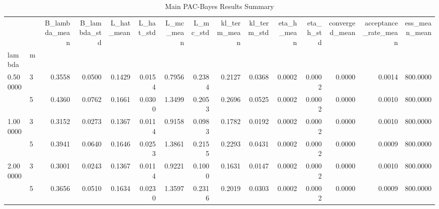 \begin{table}
\caption{Main PAC-Bayes Results Summary}
\label{tab:main_results}
\begin{tabular}{llrrrrrrrrrrrrr}
\toprule
 &  & B_lambda_mean & B_lambda_std & L_hat_mean & L_hat_std & L_mc_mean & L_mc_std & kl_term_mean & kl_term_std & eta_h_mean & eta_h_std & converged_mean & acceptance_rate_mean & ess_mean_mean \\
lambda & m &  &  &  &  &  &  &  &  &  &  &  &  &  \\
\midrule
\multirow[t]{2}{*}{0.500000} & 3 & 0.3558 & 0.0500 & 0.1429 & 0.0154 & 0.7956 & 0.2384 & 0.2127 & 0.0368 & 0.0002 & 0.0002 & 0.0000 & 0.0014 & 800.0000 \\
 & 5 & 0.4360 & 0.0762 & 0.1661 & 0.0300 & 1.3499 & 0.2053 & 0.2696 & 0.0525 & 0.0002 & 0.0002 & 0.0000 & 0.0010 & 800.0000 \\
\cline{1-15}
\multirow[t]{2}{*}{1.000000} & 3 & 0.3152 & 0.0273 & 0.1367 & 0.0114 & 0.9158 & 0.0983 & 0.1782 & 0.0192 & 0.0002 & 0.0002 & 0.0000 & 0.0010 & 800.0000 \\
 & 5 & 0.3941 & 0.0640 & 0.1646 & 0.0253 & 1.3861 & 0.2155 & 0.2293 & 0.0431 & 0.0002 & 0.0002 & 0.0000 & 0.0009 & 800.0000 \\
\cline{1-15}
\multirow[t]{2}{*}{2.000000} & 3 & 0.3001 & 0.0243 & 0.1367 & 0.0114 & 0.9221 & 0.1000 & 0.1631 & 0.0147 & 0.0002 & 0.0002 & 0.0000 & 0.0010 & 800.0000 \\
 & 5 & 0.3656 & 0.0510 & 0.1634 & 0.0230 & 1.3597 & 0.2316 & 0.2019 & 0.0303 & 0.0002 & 0.0002 & 0.0000 & 0.0009 & 800.0000 \\
\cline{1-15}
\bottomrule
\end{tabular}
\end{table}
